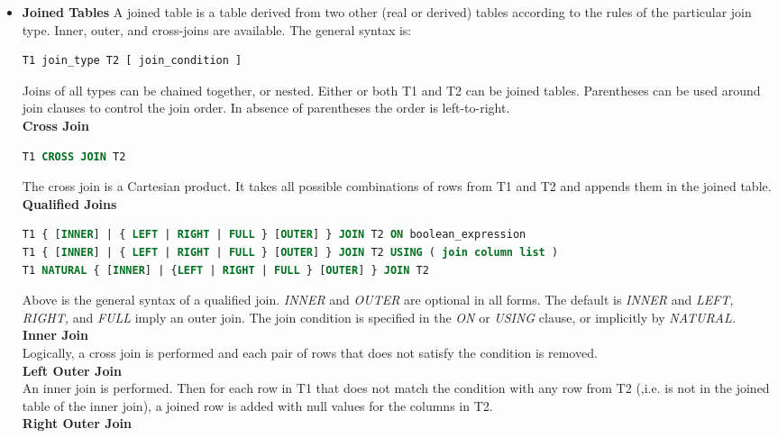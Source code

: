 \begin{addmargin}{-.5cm}
\begin{itemize}
\item \textbf{Joined Tables}
A joined table is a table derived from two other (real or derived) tables according to the rules of the particular join type. Inner, outer, and cross-joins are available. The general syntax is:
\begin{lstlisting}[language=SQL]
T1 join_type T2 [ join_condition ]
\end{lstlisting}
Joins of all types can be chained together, or nested. Either or both T1 and T2 can be joined tables. Parentheses can be used around join clauses to control the join order. In absence of parentheses the order is left-to-right.\vspace{.2cm}\\
\textbf{Cross Join}
\begin{lstlisting}[language=SQL]
T1 CROSS JOIN T2
\end{lstlisting}
The cross join is a Cartesian product. It takes all possible combinations of rows from T1 and T2 and appends them in the joined table.\vspace{.2cm}\\
\textbf{Qualified Joins}
\begin{lstlisting}[language=SQL]
T1 { [INNER] | { LEFT | RIGHT | FULL } [OUTER] } JOIN T2 ON boolean_expression
T1 { [INNER] | { LEFT | RIGHT | FULL } [OUTER] } JOIN T2 USING ( join column list )
T1 NATURAL { [INNER] | {LEFT | RIGHT | FULL } [OUTER] } JOIN T2
\end{lstlisting}
Above is the general syntax of a qualified join. \textit{INNER} and \textit{OUTER} are optional in all forms. The default is \textit{INNER} and \textit{LEFT, RIGHT,} and \textit{FULL} imply an outer join. The join condition is specified in the \textit{ON} or \textit{USING} clause, or implicitly by \textit{NATURAL.}\vspace{.2cm}\\
\textbf{Inner Join}\\
Logically, a cross join is performed and each pair of rows that does not satisfy the condition is removed.\vspace{.2cm}\\
\textbf{Left Outer Join}\\
An inner join is performed. Then for each row in T1 that does not match the condition with any row from T2 (,i.e. is not in the joined table of the inner join), a joined row is added with null values for the columns in T2.\vspace{.2cm}\\
\textbf{Right Outer Join}\\

\end{itemize}
\end{addmargin}

